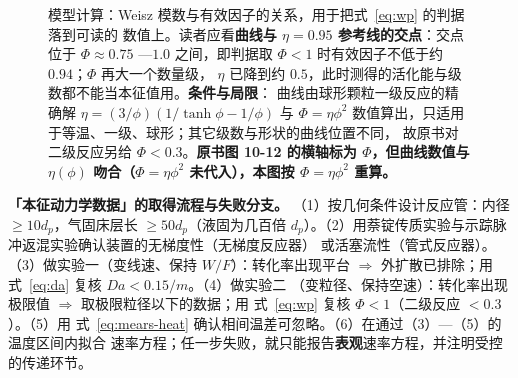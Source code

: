 \begin{figure}[htbp]
\centering
{}
\caption{模型计算：Weisz 模数与有效因子的关系，用于把式~\eqref{eq:wp} 的判据落到可读的
数值上。读者应看\textbf{曲线与 $\eta=0.95$ 参考线的交点}：交点位于 $\Phi\approx 0.75$
—$1.0$ 之间，即判据取 $\Phi<1$ 时有效因子不低于约 $0.94$；$\Phi$ 再大一个数量级，
$\eta$ 已降到约 $0.5$，此时测得的活化能与级数都不能当本征值用。\textbf{条件与局限}：
曲线由球形颗粒一级反应的精确解 $\eta=(3/\phi)(1/\tanh\phi-1/\phi)$ 与
$\Phi=\eta\phi^{2}$ 数值算出，只适用于等温、一级、球形；其它级数与形状的曲线位置不同，
故原书对二级反应另给 $\Phi<0.3$。\textbf{原书图 10-12 的横轴标为 $\Phi$，但曲线数值与 $\eta(\phi)$ 吻合（$\Phi=\eta\phi^2$ 未代入），本图按 $\Phi=\eta\phi^2$ 重算。}\modelmark{}}
\label{fig:ch10-etaphi}
\end{figure}

\begin{dataflow}
\textbf{「本征动力学数据」的取得流程与失败分支。}
（1）按几何条件设计反应管：内径 $\ge 10d_p$，气固床层长 $\ge 50d_p$（液固为几百倍
$d_p$）。（2）用萘锭传质实验与示踪脉冲返混实验确认装置的无梯度性（无梯度反应器）
或活塞流性（管式反应器）。（3）做实验一（变线速、保持 $W/F$）：转化率出现平台
$\Rightarrow$ 外扩散已排除；用式~\eqref{eq:da} 复核 $Da<0.15/m$。（4）做实验二
（变粒径、保持空速）：转化率出现极限值 $\Rightarrow$ 取极限粒径以下的数据；用
式~\eqref{eq:wp} 复核 $\Phi<1$（二级反应 $<0.3$）。（5）用
式~\eqref{eq:mears-heat} 确认相间温差可忽略。（6）在通过（3）—（5）的温度区间内拟合
速率方程；任一步失败，就只能报告\textbf{表观}速率方程，并注明受控的传递环节。
\end{dataflow}

